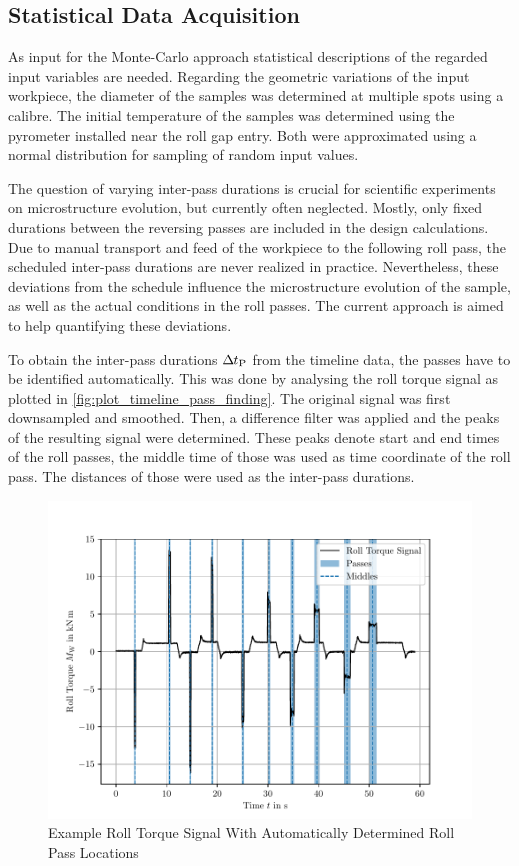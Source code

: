 \subsection{Statistical Data Acquisition}\label{subsec:data-acquisition}

As input for the Monte-Carlo approach statistical descriptions of the regarded input variables are needed.
Regarding the geometric variations of the input workpiece, the diameter of the samples was determined at multiple spots using a calibre.
The initial temperature of the samples was determined using the pyrometer installed near the roll gap entry.
Both were approximated using a normal distribution for sampling of random input values.

The question of varying inter-pass durations is crucial for scientific experiments on microstructure evolution, but currently often neglected.
Mostly, only fixed durations between the reversing passes are included in the design calculations.
Due to manual transport and feed of the workpiece to the following roll pass, the scheduled inter-pass durations are never realized in practice.
Nevertheless, these deviations from the schedule influence the microstructure evolution of the sample, as well as the actual conditions in the roll passes.
The current approach is aimed to help quantifying these deviations.

To obtain the inter-pass durations ${{\Delta\mspace{-1mu}t}_\mathrm{P}}$ from the timeline data, the passes have to be identified automatically.
This was done by analysing the roll torque signal as plotted in \autoref{fig:plot_timeline_pass_finding}.
The original signal was first downsampled and smoothed.
Then, a difference filter was applied and the peaks of the resulting signal were determined.
These peaks denote start and end times of the roll passes, the middle time of those was used as time coordinate of the roll pass.
The distances of those were used as the inter-pass durations.

\begin{figure}
    \centering
    \includegraphics{img/plot_timeline_pass_finding}
    \caption{Example Roll Torque Signal With Automatically Determined Roll Pass Locations}
    \label{fig:plot_timeline_pass_finding}
\end{figure}

